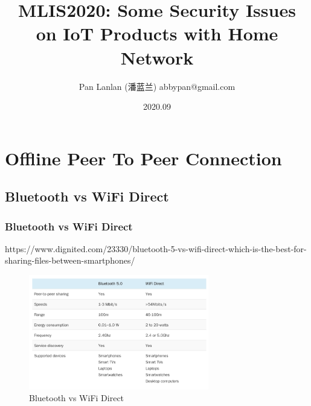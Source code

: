 \documentclass{ctexbeamer}
\title{MLIS2020: Some Security Issues on IoT Products with Home Network}
\author{Pan Lanlan (潘蓝兰) \newline  \newline abbypan@gmail.com}
\institute[China]{Guangdong OPPO Mobile Telecommunications Corp. Ltd., China}
\date{2020.09}
\begin{document}
\frame{\titlepage}

\frame{\tableofcontents}
\clearpage

\section{Offline Peer To Peer Connection}

\subsection{Bluetooth vs WiFi Direct}
\begin{frame}
\frametitle{Bluetooth vs WiFi Direct}

    https://www.dignited.com/23330/bluetooth-5-vs-wifi-direct-which-is-the-best-for-sharing-files-between-smartphones/

    \begin{figure}[H]
        \centering 
        \includegraphics[width=0.7\textwidth]{pic/ble-wifi-direct.png} 
        \caption{Bluetooth vs WiFi Direct} 
        \label{fig.ble.wifi.direct}
    \end{figure}

\end{frame}
\end{document}
